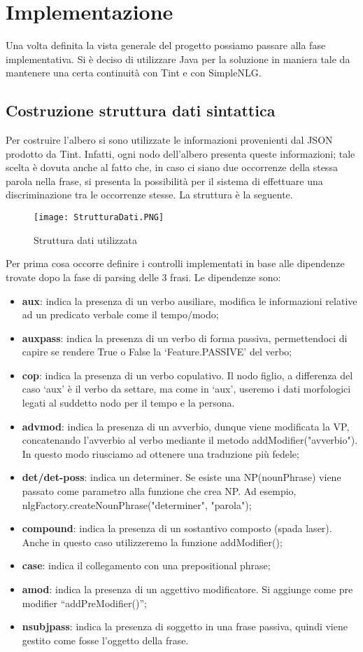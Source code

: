 \chapter{Implementazione}
Una volta definita la vista generale del progetto possiamo passare alla fase implementativa. Si è deciso di utilizzare Java per la soluzione in maniera tale da mantenere una certa continuità con Tint e con SimpleNLG.\\
\section{Costruzione struttura dati sintattica}
Per costruire l'albero si sono utilizzate le informazioni provenienti dal JSON prodotto da Tint. Infatti, ogni nodo dell'albero presenta queste informazioni; tale scelta è dovuta anche al fatto che, in caso ci siano due occorrenze della stessa parola nella frase, si presenta la possibilità per il sistema di effettuare una discriminazione tra le occorrenze stesse. La struttura è la seguente.\\
\begin{figure}[h!]
	\texttt{[image: StrutturaDati.PNG]}
	\centering
	\caption{Struttura dati utilizzata}
	\label{fig:PM}
\end{figure}
\clearpage
Per prima cosa occorre definire i controlli implementati in base alle dipendenze trovate dopo la fase di parsing delle 3 frasi. Le dipendenze sono:
\begin{itemize}
	\item \textbf{aux}: indica la presenza di un verbo ausiliare, modifica le informazioni relative ad un predicato verbale come il tempo/modo;
	\item \textbf{auxpass}: indica la presenza di un verbo di forma passiva, permettendoci di capire se
	rendere True o False la ‘Feature.PASSIVE’ del verbo;
	\item \textbf{cop}: indica la presenza di un verbo copulativo. Il nodo figlio, a differenza del caso
	‘aux’ è il verbo da settare, ma come in ‘aux’, useremo i dati morfologici legati al
	suddetto nodo per il tempo e la persona.
	\item \textbf{advmod}: indica la presenza di un avverbio, dunque viene modificata la VP, concatenando l’avverbio al verbo mediante il metodo addModifier("avverbio"). In questo modo riusciamo ad ottenere una traduzione più fedele;
	\item \textbf{det/det-poss}: indica un determiner. Se esiste una NP(nounPhrase) viene passato come parametro alla funzione che crea NP. Ad esempio, nlgFactory.createNounPhrase("determiner", "parola");
	\item \textbf{compound}: indica la presenza di un sostantivo composto (spada laser). Anche in questo caso utilizzeremo la funzione addModifier();
	\item \textbf{case}: indica il collegamento con una prepositional phrase;
	\item \textbf{amod}: indica la presenza di un aggettivo modificatore. Si aggiunge come pre modifier “addPreModifier()”;
	\item \textbf{nsubjpass}: indica la presenza di soggetto in una frase passiva, quindi viene gestito come fosse l’oggetto della frase.
\end{itemize}
